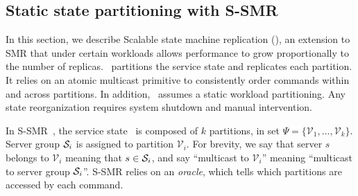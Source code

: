 
\subsection{Static state partitioning with S-SMR}
\label{sec:ssmr}

In this section, we describe Scalable state machine replication (\ssmr), an
extension to SMR that under certain workloads allows performance to grow
proportionally to the number of replicas. \ssmr\ partitions the service state
and replicates each partition. It relies on an atomic multicast primitive to
consistently order commands within and across partitions. In addition, \ssmr\
assumes a static workload partitioning. Any state reorganization requires system
shutdown and manual intervention.

In S-SMR~\cite{bezerra2014ssmr}, the service state \vvt\ is composed of $k$
partitions, in set $\Psi = \{\mathcal{V}_1, ..., \mathcal{V}_k\}$. Server group
$\mathcal{S}_i$ is assigned to partition $\mathcal{V}_i$. For brevity, we say that
server $s$ belongs to $\mathcal{V}_i$ meaning that $s \in \mathcal{S}_i$, and say
``multicast to $\mathcal{V}_i$'' meaning ``multicast to server group $\mathcal{S}_i$''.
S-SMR relies on an \emph{oracle}, which tells which partitions are accessed by
each command.


